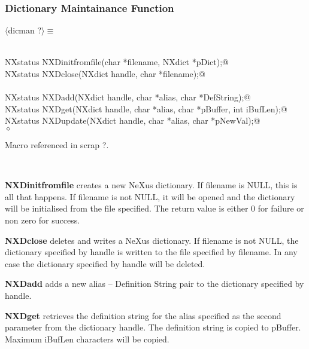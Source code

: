 \documentclass[12pt]{article}
\begin{document}
\subsubsection{Dictionary Maintainance Function}
\begin{flushleft} \small
\begin{minipage}{\linewidth} \label{scrap2}
$\langle$dicman {\footnotesize ?}$\rangle\equiv$
\vspace{-1ex}
\begin{list}{}{} \item
\mbox{}\verb@@\\
\mbox{}\verb@   NXstatus NXDinitfromfile(char *filename, NXdict *pDict);@\\
\mbox{}\verb@   NXstatus NXDclose(NXdict handle, char *filename);@\\
\mbox{}\verb@@\\
\mbox{}\verb@   NXstatus NXDadd(NXdict handle, char *alias, char *DefString);@\\
\mbox{}\verb@   NXstatus NXDget(NXdict handle, char *alias, char *pBuffer, int iBufLen);@\\
\mbox{}\verb@   NXstatus NXDupdate(NXdict handle, char *alias, char *pNewVal);@\\
\mbox{}\verb@@$\diamond$
\end{list}
\vspace{-1ex}
\footnotesize\addtolength{\baselineskip}{-1ex}
\begin{list}{}{\setlength{\itemsep}{-\parsep}\setlength{\itemindent}{-\leftmargin}}
\item Macro referenced in scrap ?.
\end{list}
\end{minipage}\\[4ex]
\end{flushleft}
{\bf NXDinitfromfile} creates a new NeXus dictionary. If filename is NULL, this
  is all that happens. If filename is not NULL, it will be opened and the
  dictionary will be initialised from the file specified.  The return value
  is either 0 for failure or non zero for success. 

  {\bf NXDclose} deletes and writes a NeXus dictionary. If filename is not NULL,
  the dictionary specified by handle is written to the file specified by
  filename. In any case the dictionary specified by handle will be deleted.

  {\bf NXDadd} adds a new alias -- Definition String pair to the dictionary
  specified by handle.

  {\bf NXDget} retrieves the definition string for the alias specified as
  the second parameter from the dictionary handle. The definition string
  is copied to pBuffer. Maximum iBufLen characters will be copied.
\end{document}
